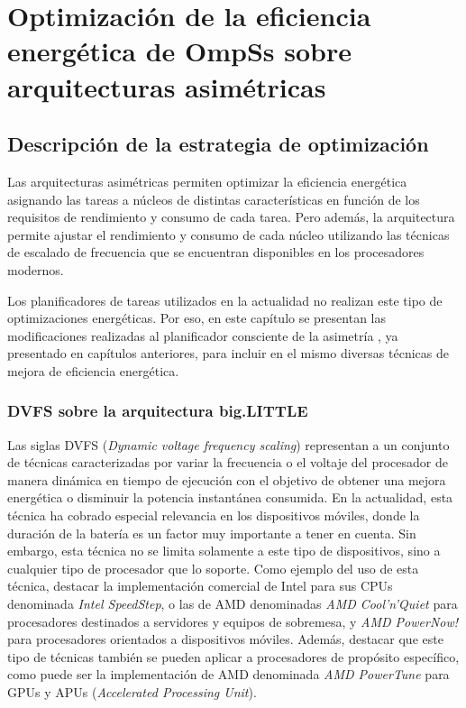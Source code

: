 \cleardoublepage

\chapter{Optimización de la eficiencia energética de OmpSs sobre arquitecturas asimétricas}
\label{ch:chapter5}

\section{Descripción de la estrategia de optimización}

Las arquitecturas asimétricas permiten optimizar la eficiencia energética
asignando las tareas a núcleos de distintas características en función de
los requisitos de rendimiento y consumo de cada tarea. Pero además, la
arquitectura permite ajustar el rendimiento y consumo de cada núcleo
utilizando las técnicas de escalado de frecuencia que se encuentran
disponibles en los procesadores modernos.

Los planificadores de tareas utilizados en la actualidad no realizan este
tipo de optimizaciones energéticas. Por eso, en este capítulo se presentan
las modificaciones realizadas al planificador consciente de la asimetría
\botlev, ya presentado en capítulos anteriores, para incluir en el mismo
diversas técnicas de mejora de eficiencia energética.


\subsection{DVFS sobre la arquitectura big.LITTLE}
\label{sec:DVFS_BIGLITTLE}
Las siglas DVFS (\emph{Dynamic voltage frequency scaling}) representan a un
conjunto de técnicas caracterizadas por variar la frecuencia o el voltaje
del procesador de manera dinámica en tiempo de ejecución con el objetivo de
obtener una mejora energética o disminuir la potencia instantánea
consumida. En la actualidad, esta técnica ha cobrado especial relevancia en
los dispositivos móviles, donde la duración de la batería es un factor muy
importante a tener en cuenta. Sin embargo, esta técnica no se limita
solamente a este tipo de dispositivos, sino a cualquier tipo de procesador
que lo soporte. Como ejemplo del uso de esta técnica, destacar la
implementación comercial de Intel para sus CPUs denominada \emph{Intel
  SpeedStep}, o las de AMD denominadas \emph{AMD Cool'n'Quiet} para
procesadores destinados a servidores y equipos de sobremesa, y \emph{AMD
  PowerNow!}  para procesadores orientados a dispositivos móviles. Además,
destacar que este tipo de técnicas también se pueden aplicar a procesadores
de propósito específico, como puede ser la implementación de AMD denominada
\emph{AMD PowerTune} para GPUs y APUs (\emph{Accelerated Processing Unit}).


